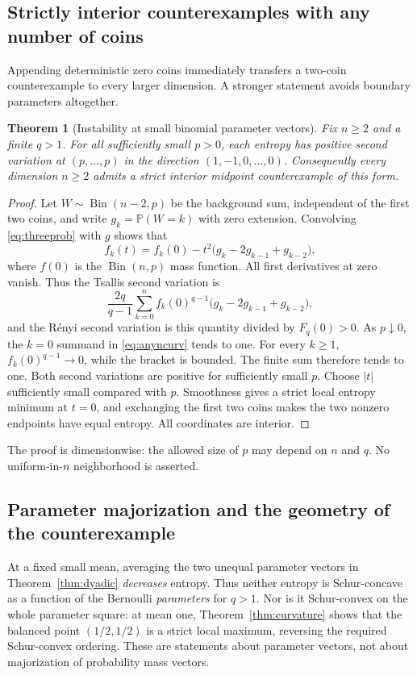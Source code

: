 \documentclass[11pt]{article}
\numberwithin{equation}{section}
\newtheorem{theorem}{Theorem}[section]
\theoremstyle{definition}
\theoremstyle{remark}
\newcommand{\Bin}{\operatorname{Bin}}
\begin{document}
\subsection{Strictly interior counterexamples with any number of coins}
Appending deterministic zero coins immediately transfers a two-coin
counterexample to every larger dimension. A stronger statement avoids
boundary parameters altogether.

\begin{theorem}[Instability at small binomial parameter vectors]
\label{thm:anyn}
Fix $n\geq2$ and a finite $q>1$. For all sufficiently small $p>0$, each
entropy has positive second variation at $(p,\ldots,p)$ in the direction
$(1,-1,0,\ldots,0)$. Consequently every dimension $n\geq2$ admits a strict
interior midpoint counterexample of this form.
\end{theorem}
\begin{proof}
Let $W\sim\Bin(n-2,p)$ be the background sum, independent of the first two
coins, and write $g_k=\mathbb P(W=k)$ with zero extension. Convolving
\eqref{eq:threeprob} with $g$ shows that
\begin{equation}
 f_k(t)=f_k(0)-t^2\bigl(g_k-2g_{k-1}+g_{k-2}\bigr),
 \label{eq:background}
\end{equation}
where $f(0)$ is the $\Bin(n,p)$ mass function. All first derivatives at zero
vanish. Thus the Tsallis second variation is
\begin{equation}
 \frac{2q}{q-1}\sum_{k=0}^n f_k(0)^{q-1}
              \bigl(g_k-2g_{k-1}+g_{k-2}\bigr),\label{eq:anyncurv}
\end{equation}
and the R\'enyi second variation is this quantity divided by $F_q(0)>0$.
As $p\downarrow0$, the $k=0$ summand in \eqref{eq:anyncurv} tends to one.
For every $k\geq1$, $f_k(0)^{q-1}\to0$, while the bracket is bounded.
The finite sum therefore tends to one. Both second variations are positive
for sufficiently small $p$.
Choose $|t|$ sufficiently small compared with $p$. Smoothness gives a strict
local entropy minimum at $t=0$, and exchanging the first two coins makes
the two nonzero endpoints have equal entropy. All coordinates are interior.
\end{proof}

The proof is dimensionwise: the allowed size of $p$ may depend on $n$ and
$q$. No uniform-in-$n$ neighborhood is asserted.

\subsection{Parameter majorization and the geometry of the counterexample}
At a fixed small mean, averaging the two unequal parameter vectors in
Theorem~\ref{thm:dyadic} \emph{decreases} entropy. Thus neither entropy is
Schur-concave as a function of the Bernoulli \emph{parameters} for $q>1$.
Nor is it Schur-convex on the whole parameter square: at mean one,
Theorem~\ref{thm:curvature} shows that the balanced point $(1/2,1/2)$ is a
strict local maximum, reversing the required Schur-convex ordering.
These are statements about parameter vectors, not about majorization of
probability mass vectors.
\end{document}
